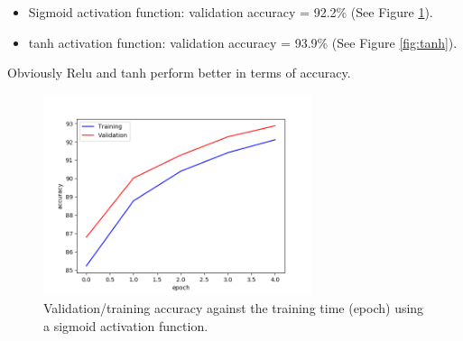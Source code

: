 \documentclass[a4paper]{article}
\begin{document}
\begin{enumerate}
\begin{itemize}
\item Sigmoid activation function: validation accuracy = 92.2\% (See Figure \ref{fig:sigmoid}).

\item tanh activation function: validation accuracy = 93.9\% (See Figure \ref{fig:tanh}).  
  
\end{itemize}
Obviously Relu and tanh perform better in terms of accuracy. 
\begin{figure}
\centering
\includegraphics[width=0.7\textwidth]{epoch2.png}
\caption{\label{fig:sigmoid}Validation/training accuracy against the training time (epoch) using a sigmoid activation function.}
\end{figure}


\end{enumerate}
\end{document}
